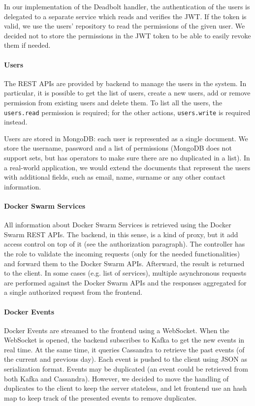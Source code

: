 In our implementation of the Deadbolt handler, the authentication of the users is delegated to a separate service which reads and verifies the JWT.
If the token is valid, we use the users' repository to read the permissions of the given user.
We decided not to store the permissions in the JWT token to be able to easily revoke them if needed.

\paragraph{Users}
The REST APIs are provided by backend to manage the users in the system.
In particular, it is possible to get the list of users, create a new users, add or remove permission from existing users and delete them.
To list all the users, the \texttt{users.read} permission is required;
for the other actions, \texttt{users.write} is required instead.

Users are stored in MongoDB: each user is represented as a single document.
We store the username, password and a list of permissions (MongoDB does not support sets, but has operators to make sure there are no duplicated in a list).
In a real-world application, we would extend the documents that represent the users with additional fields, such as email, name, surname or any other contact information.

\paragraph{Docker Swarm Services}
All information about Docker Swarm Services is retrieved using the Docker Swarm REST APIs.
The backend, in this sense, is a kind of proxy, but it add access control on top of it (see the authorization paragraph).
The controller has the role to validate the incoming requests (only for the needed functionalities) and forward them to the Docker Swarm APIs.
Afterward, the result is returned to the client.
In some cases (e.g. list of services), multiple asynchronous requests are performed against the Docker Swarm APIs and the responses aggregated for a single authorized request from the frontend.

\paragraph{Docker Events}
Docker Events are streamed to the frontend using a WebSocket.
When the WebSocket is opened, the backend subscribes to Kafka to get the new events in real time.
At the same time, it queries Cassandra to retrieve the past events (of the current and previous day).
Each event is pushed to the client using JSON as serialization format.
Events may be duplicated (an event could be retrieved from both Kafka and Cassandra).
However, we decided to move the handling of duplicates to the client to keep the server stateless, and let frontend use an hash map to keep track of the presented events to remove duplicates.


